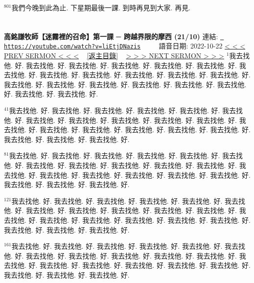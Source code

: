 \documentclass{book}
\begin{document}
$^{801}$我們今晚到此為止.
下星期最後一課.
到時再見到大家.
再見.
\newpage



\section{}
\label{sec:liEtjDNazis}
\textbf{高銘謙牧師【迷霧裡的召命】第一課 ─ 跨越界限的摩西 (21/10)}
\newline
\newline
連結: \href{https://youtube.com/watch?v=liEtjDNazis}{\texttt{ https://youtube.com/watch?v=liEtjDNazis}} ~~~~ 語音日期: 2022-10-22 
\newline
\newline
\hyperref[sec:_CzKRoa8y_w]{\small{< < < PREV SERMON < < <}}
~
\hyperref[sec:index]{\small{[返主目錄]}}
~
\hyperref[sec:H4gdcVXwfVM]{\small{> > > NEXT SERMON > > >}}
\newline
\newline
$^{1}$我去找他.
好.
我去找他.
好.
我去找他.
好.
我去找他.
好.
我去找他.
好.
我去找他.
好.
我去找他.
好.
我去找他.
好.
我去找他.
好.
我去找他.
好.
我去找他.
好.
我去找他.
好.
我去找他.
好.
我去找他.
好.
我去找他.
好.
我去找他.
好.
我去找他.
好.
我去找他.
好.
我去找他.
好.
我去找他.
好.

$^{41}$我去找他.
好.
我去找他.
好.
我去找他.
好.
我去找他.
好.
我去找他.
好.
我去找他.
好.
我去找他.
好.
我去找他.
好.
我去找他.
好.
我去找他.
好.
我去找他.
好.
我去找他.
好.
我去找他.
好.
我去找他.
好.
我去找他.
好.
我去找他.
好.
我去找他.
好.
我去找他.
好.
我去找他.
好.
我去找他.
好.

$^{81}$我去找他.
好.
我去找他.
好.
我去找他.
好.
我去找他.
好.
我去找他.
好.
我去找他.
好.
我去找他.
好.
我去找他.
好.
我去找他.
好.
我去找他.
好.
我去找他.
好.
我去找他.
好.
我去找他.
好.
我去找他.
好.
我去找他.
好.
我去找他.
好.
我去找他.
好.
我去找他.
好.
我去找他.
好.
我去找他.
好.

$^{121}$我去找他.
好.
我去找他.
好.
我去找他.
好.
我去找他.
好.
我去找他.
好.
我去找他.
好.
我去找他.
好.
我去找他.
好.
我去找他.
好.
我去找他.
好.
我去找他.
好.
我去找他.
好.
我去找他.
好.
我去找他.
好.
我去找他.
好.
我去找他.
好.
我去找他.
好.
我去找他.
好.
我去找他.
好.
我去找他.
好.

$^{161}$我去找他.
好.
我去找他.
好.
我去找他.
好.
我去找他.
好.
我去找他.
好.
我去找他.
好.
我去找他.
好.
我去找他.
好.
我去找他.
好.
我去找他.
好.
我去找他.
好.
我去找他.
好.
我去找他.
好.
我去找他.
好.
我去找他.
好.
我去找他.
好.
我去找他.
好.
我去找他.
好.
我去找他.
好.
我去找他.
好.
\end{document}
